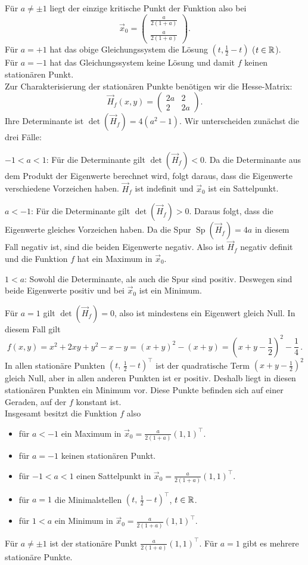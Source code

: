 {F\"ur $a\neq \pm 1$ liegt der einzige kritische Punkt der Funktion also bei 
$$\vec x_0 = \begin{pmatrix} \frac{ a}{2(1+a)}\\ \frac{a}{2(1+a)}\end{pmatrix}. 
$$
F\"ur $a=+1$ hat das obige Gleichungssystem die L\"osung $(t,\frac 12 -t)$ ($t\in\mathbb{R}$). \\
F\"ur $a=-1$ hat das Gleichungssystem keine L\"osung und damit $f$ keinen station\"aren Punkt. \\
Zur Charakterisierung der station\"aren Punkte ben\"otigen wir die Hesse-Matrix: 
$$\vec H_f(x,y)=\begin{pmatrix} 2a& 2\\ 2 & 2a\end{pmatrix}.$$
Ihre Determinante ist \(\det (\vec H_f) = 4 (a^2-1)\).
Wir unterscheiden zun\"achst die drei F\"alle: 
\begin{iii}
\item $-1<a<1$: F\"ur die Determinante gilt \(\det(\vec H_f) < 0\). Da die Determinante aus dem Produkt der Eigenwerte berechnet wird, folgt daraus, dass die Eigenwerte verschiedene Vorzeichen haben. $\vec H_f$ ist indefinit und $\vec x_0$ ist ein
Sattelpunkt. 
\item $a<-1$: F\"ur die Determinante gilt \(\det(\vec H_f) > 0\). Daraus folgt, dass die Eigenwerte gleiches Vorzeichen haben. Da die Spur \(\operatorname{Sp}(\vec H_f) = 4 a\)  in diesem Fall negativ ist, sind die beiden Eigenwerte negativ. Also ist $\vec H_f$  negativ definit und die Funktion $f$ hat ein Maximum in $\vec x_0$. 
\item $1<a$: Sowohl die Determinante, als auch die Spur sind positiv. Deswegen sind beide Eigenwerte positiv und bei $\vec x_0$ ist ein Minimum. 
\end{iii}
F\"ur $a=1$ gilt \(\det(\vec H_f)=0\), also ist mindestens ein Eigenwert gleich Null. In diesem Fall gilt \[f(x,y) = x^2+2xy+y^2-x-y = (x+y)^2 - (x+y) = \left(x+y-\frac12\right)^2 - \frac14\,.\]
In allen station\"are Punkten $(t,\, \frac 12 -t)^\top$ ist der quadratische Term \((x+y-\frac12)^2\) gleich Null, aber in allen anderen Punkten ist er positiv. Deshalb liegt in diesen station\"aren Punkten ein Minimum vor. Diese Punkte
befinden sich auf einer Geraden, auf der $f$ konstant ist. \\
Insgesamt besitzt die Funktion $f$ also 
\begin{itemize}
\item f\"ur $a<-1$ ein Maximum in $\vec x_0=\frac a{2(1+a)}(1,1)^\top$. 
\item f\"ur $a=-1$ keinen station\"aren Punkt. 
\item f\"ur $-1<a<1$ einen Sattelpunkt in $\vec x_0=\frac a{2(1+a)}(1,1)^\top$. 
\item f\"ur $a=1$ die Minimalstellen $(t,\, \frac 12 - t)^\top$, $t\in\mathbb{R}$. 
\item f\"ur $1<a$ ein Minimum in $\vec x_0=\frac a{2(1+a)}(1,1)^\top$. 
\end{itemize}
}

{
{
F\"ur $a\neq \pm 1$ ist der station\"are Punkt $\frac a{2(1+a)}(1,1)^\top$. F\"ur $a=1$ gibt es
mehrere station\"are Punkte. 
}
}

